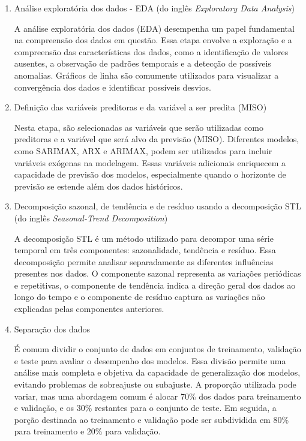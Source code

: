 \begin{enumerate}[start=1, label={\textbf{Etapa} \arabic*}]
	\item Análise exploratória dos dados - EDA (do inglês \textit{Exploratory Data Analysis})\label{etp:1}
	
	A análise exploratória dos dados (EDA) desempenha um papel fundamental na compreensão dos dados em questão. Essa etapa envolve a exploração e a compreensão das características dos dados, como a identificação de valores ausentes, a observação de padrões temporais e a detecção de possíveis anomalias. Gráficos de linha são comumente utilizados para visualizar a convergência dos dados e identificar possíveis desvios.
	
	\item Definição das variáveis preditoras e da variável a ser predita (MISO)\label{etp:2}
	
	Nesta etapa, são selecionadas as variáveis que serão utilizadas como preditoras e a variável que será alvo da previsão (MISO). Diferentes modelos, como SARIMAX, ARX e ARIMAX, podem ser utilizados para incluir variáveis exógenas na modelagem. Essas variáveis adicionais enriquecem a capacidade de previsão dos modelos, especialmente quando o horizonte de previsão se estende além dos dados históricos.
	
	\item Decomposição sazonal, de tendência e de resíduo usando a decomposição STL (do inglês \textit{Seasonal-Trend Decomposition})\label{etp:3}
	
	A decomposição STL é um método utilizado para decompor uma série temporal em três componentes: sazonalidade, tendência e resíduo. Essa decomposição permite analisar separadamente as diferentes influências presentes nos dados. O componente sazonal representa as variações periódicas e repetitivas, o componente de tendência indica a direção geral dos dados ao longo do tempo e o componente de resíduo captura as variações não explicadas pelas componentes anteriores.
	
	\item Separação dos dados\label{etp:4}
	
	É comum dividir o conjunto de dados em conjuntos de treinamento, validação e teste para avaliar o desempenho dos modelos. Essa divisão permite uma análise mais completa e objetiva da capacidade de generalização dos modelos, evitando problemas de sobreajuste ou subajuste. A proporção utilizada pode variar, mas uma abordagem comum é alocar 70\% dos dados para treinamento e validação, e os 30\% restantes para o conjunto de teste. Em seguida, a porção destinada ao treinamento e validação pode ser subdividida em 80\% para treinamento e 20\% para validação.
	

\end{enumerate}
